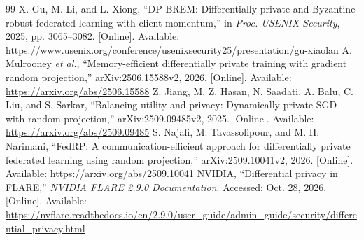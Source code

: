 \documentclass[conference,letterpaper]{IEEEtran}
\begin{document}
\begin{thebibliography}{99}
 X. Gu, M. Li, and L. Xiong, ``DP-BREM: Differentially-private and Byzantine-robust federated learning with client momentum,'' in \emph{Proc. USENIX Security}, 2025, pp. 3065--3082. [Online]. Available: \url{https://www.usenix.org/conference/usenixsecurity25/presentation/gu-xiaolan}
 A. Mulrooney \emph{et al.}, ``Memory-efficient differentially private training with gradient random projection,'' arXiv:2506.15588v2, 2026. [Online]. Available: \url{https://arxiv.org/abs/2506.15588}
 Z. Jiang, M. Z. Hasan, N. Saadati, A. Balu, C. Liu, and S. Sarkar, ``Balancing utility and privacy: Dynamically private SGD with random projection,'' arXiv:2509.09485v2, 2025. [Online]. Available: \url{https://arxiv.org/abs/2509.09485}
 S. Najafi, M. Tavassolipour, and M. H. Narimani, ``FedRP: A communication-efficient approach for differentially private federated learning using random projection,'' arXiv:2509.10041v2, 2026. [Online]. Available: \url{https://arxiv.org/abs/2509.10041}
 NVIDIA, ``Differential privacy in FLARE,'' \emph{NVIDIA FLARE 2.9.0 Documentation}. Accessed: Oct. 28, 2026. [Online]. Available: \url{https://nvflare.readthedocs.io/en/2.9.0/user_guide/admin_guide/security/differential_privacy.html}
\end{thebibliography}
\end{document}

